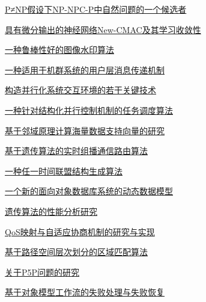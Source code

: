 \documentclass[a4paper]{article}
\begin{document}
\href{http://www.jos.org.cn/ch/reader/download_pdf.aspx?file_no=20010504&year_id=2001&quarter_id=5&falg=1}{P≠NP假设下NP-NPC-P中自然问题的一个候选者}

\href{http://www.jos.org.cn/ch/reader/download_pdf.aspx?file_no=20010505&year_id=2001&quarter_id=5&falg=1}{具有微分输出的神经网络New-CMAC及其学习收敛性}

\href{http://www.jos.org.cn/ch/reader/download_pdf.aspx?file_no=20010506&year_id=2001&quarter_id=5&falg=1}{一种鲁棒性好的图像水印算法}

\href{http://www.jos.org.cn/ch/reader/download_pdf.aspx?file_no=20010508&year_id=2001&quarter_id=5&falg=1}{一种适用于机群系统的用户层消息传递机制}

\href{http://www.jos.org.cn/ch/reader/download_pdf.aspx?file_no=20010509&year_id=2001&quarter_id=5&falg=1}{构造并行化系统交互环境的若干关键技术}

\href{http://www.jos.org.cn/ch/reader/download_pdf.aspx?file_no=20010510&year_id=2001&quarter_id=5&falg=1}{一种针对结构化并行控制机制的任务调度算法}

\href{http://www.jos.org.cn/ch/reader/download_pdf.aspx?file_no=20010511&year_id=2001&quarter_id=5&falg=1}{基于邻域原理计算海量数据支持向量的研究}

\href{http://www.jos.org.cn/ch/reader/download_pdf.aspx?file_no=20010512&year_id=2001&quarter_id=5&falg=1}{基于遗传算法的实时组播通信路由算法}

\href{http://www.jos.org.cn/ch/reader/download_pdf.aspx?file_no=20010513&year_id=2001&quarter_id=5&falg=1}{一种任一时间联盟结构生成算法}

\href{http://www.jos.org.cn/ch/reader/download_pdf.aspx?file_no=20010514&year_id=2001&quarter_id=5&falg=1}{一个新的面向对象数据库系统的动态数据模型}

\href{http://www.jos.org.cn/ch/reader/download_pdf.aspx?file_no=20010515&year_id=2001&quarter_id=5&falg=1}{遗传算法的性能分析研究}

\href{http://www.jos.org.cn/ch/reader/download_pdf.aspx?file_no=20010516&year_id=2001&quarter_id=5&falg=1}{QoS映射与自适应协商机制的研究与实现}

\href{http://www.jos.org.cn/ch/reader/download_pdf.aspx?file_no=20010517&year_id=2001&quarter_id=5&falg=1}{基于路径空间层次划分的区域匹配算法}

\href{http://www.jos.org.cn/ch/reader/download_pdf.aspx?file_no=20010518&year_id=2001&quarter_id=5&falg=1}{关于P5P问题的研究}

\href{http://www.jos.org.cn/ch/reader/download_pdf.aspx?file_no=20010519&year_id=2001&quarter_id=5&falg=1}{基于对象模型工作流的失败处理与失败恢复}
\end{document}
